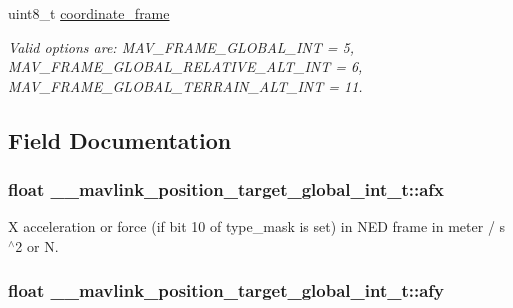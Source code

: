 \begin{DoxyCompactItemize}
uint8\+\_\+t \hyperlink{struct____mavlink__position__target__global__int__t_aa426aa02f608fe6288daaa788816d72c}{coordinate\+\_\+frame}
\begin{DoxyCompactList}\small\item\em Valid options are\+: M\+A\+V\+\_\+\+F\+R\+A\+M\+E\+\_\+\+G\+L\+O\+B\+A\+L\+\_\+\+I\+N\+T = 5, M\+A\+V\+\_\+\+F\+R\+A\+M\+E\+\_\+\+G\+L\+O\+B\+A\+L\+\_\+\+R\+E\+L\+A\+T\+I\+V\+E\+\_\+\+A\+L\+T\+\_\+\+I\+N\+T = 6, M\+A\+V\+\_\+\+F\+R\+A\+M\+E\+\_\+\+G\+L\+O\+B\+A\+L\+\_\+\+T\+E\+R\+R\+A\+I\+N\+\_\+\+A\+L\+T\+\_\+\+I\+N\+T = 11. \end{DoxyCompactList}\end{DoxyCompactItemize}


\subsection{Field Documentation}
\hypertarget{struct____mavlink__position__target__global__int__t_a79c620fe40a4fecc4ea00fb47903a503}{
\subsubsection[{afx}]{\setlength{\rightskip}{0pt plus 5cm}float \+\_\+\+\_\+mavlink\+\_\+position\+\_\+target\+\_\+global\+\_\+int\+\_\+t\+::afx}}\label{struct____mavlink__position__target__global__int__t_a79c620fe40a4fecc4ea00fb47903a503}


X acceleration or force (if bit 10 of type\+\_\+mask is set) in N\+E\+D frame in meter / s$^\wedge$2 or N. 

\hypertarget{struct____mavlink__position__target__global__int__t_a0081ae3f7a2687bd7beb9b0cae941d8e}{
\subsubsection[{afy}]{\setlength{\rightskip}{0pt plus 5cm}float \+\_\+\+\_\+mavlink\+\_\+position\+\_\+target\+\_\+global\+\_\+int\+\_\+t\+::afy}}\label{struct____mavlink__position__target__global__int__t_a0081ae3f7a2687bd7beb9b0cae941d8e}


